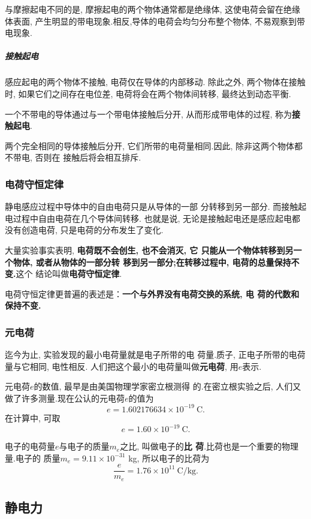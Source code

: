 \documentclass[12pt,a4paper]{ctexart}
\begin{document}
与摩擦起电不同的是, 摩擦起电的两个物体通常都是绝缘体, 这使电荷会留在绝缘体表面, 产生明显的带电现象.相反,导体的电荷会均匀分布整个物体,
不易观察到带电现象.

\subparagraph{接触起电} 感应起电的两个物体不接触, 电荷仅在导体的内部移动.
除此之外, 两个物体在接触时, 如果它们之间存在电位差, 电荷将会在两个物体间转移,
最终达到动态平衡.

一个不带电的导体通过与一个带电体接触后分开, 从而形成带电体的过程, 称为\textbf{接触起电}.

两个完全相同的导体接触后分开, 它们所带的电荷量相同.因此, 除非这两个物体都不带电, 否则在
接触后将会相互排斥.

\subsubsection{电荷守恒定律}

静电感应过程中导体中的自由电荷只是从导体的一部
分转移到另一部分. 而接触起电过程中自由电荷在几个导体间转移.
也就是说, 无论是接触起电还是感应起电都没有创造电荷, 只是电荷的分布发生了变化.

大量实验事实表明, \textbf{电荷既不会创生, 也不会消灭, 它
    只能从一个物体转移到另一个物体, 或者从物体的一部分转
    移到另一部分;在转移过程中, 电荷的总量保持不变.}这个
结论叫做\textbf{电荷守恒定律}.

电荷守恒定律更普遍的表述是：\textbf{一个与外界没有电荷交换的系统, 电
    荷的代数和保持不变.}

\subsubsection{元电荷}
迄今为止, 实验发现的最小电荷量就是电子所带的电
荷量.质子, 正电子所带的电荷量与它相同, 电性相反.
人们把这个最小的电荷量叫做\textbf{元电荷}, 用$e$表示.

元电荷$e$的数值, 最早是由美国物理学家密立根测得
的.在密立根实验之后, 人们又做了许多测量.现在公认的元电荷$e$的值为
$$e = 1.602 176 634 \times 10^{-19}\ \mathrm{C}.$$
在计算中, 可取
$$e = 1.60 \times 10^{-19}\ \mathrm{C}.$$

电子的电荷量$e$与电子的质量$m_e$之比, 叫做电子的\textbf{比
    荷}.比荷也是一个重要的物理量.电子的
质量$m_e = 9.11\times 10^{-31}$ kg, 所以电子的比荷为
$$\frac{e}{m_e} = 1.76 \times 10^{11}\ \mathrm{C/kg}.$$

\subsection{静电力}
\end{document}
